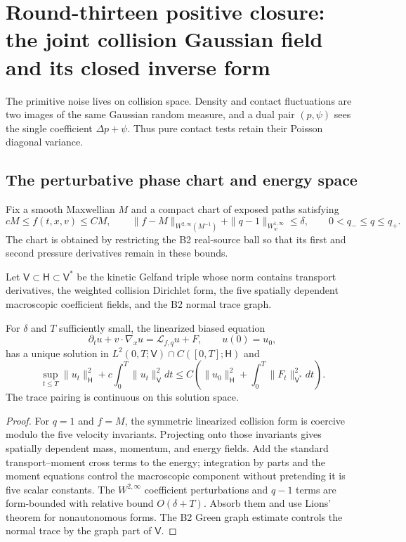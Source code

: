 \section{Round-thirteen positive closure: the joint collision Gaussian field and its closed inverse form}
\label{sec:r13-b3}

The primitive noise lives on collision space.  Density and contact
fluctuations are two images of the same Gaussian random measure, and a dual
pair $(p,\psi)$ sees the single coefficient $\Delta p+\psi$.  Thus pure
contact tests retain their Poisson diagonal variance.

\subsection{The perturbative phase chart and energy space}

Fix a smooth Maxwellian $M$ and a compact chart of exposed paths satisfying
\[
 cM\le f(t,x,v)\le CM,
 \qquad
 \|f-M\|_{W^{2,\infty}(M^{-1})}
 +\|q-1\|_{W^{1,\infty}_w}\le\delta,
 \qquad 0<q_-\le q\le q_+.
\]
The chart is obtained by restricting the B2 real-source ball so that its first
and second pressure derivatives remain in these bounds.

Let $\mathsf V\subset\mathsf H\subset\mathsf V^*$ be the kinetic Gelfand
triple whose norm contains transport derivatives, the weighted collision
Dirichlet form, the five spatially dependent macroscopic coefficient fields,
and the B2 normal trace graph.

\begin{theorem}
\label{thm:r13-b3-energy}
For $\delta$ and $T$ sufficiently small, the linearized biased equation
\[
 \partial_tu+v\cdot\nabla_xu=\mathcal L_{f,q}u+F,
 \qquad u(0)=u_0,
\]
has a unique solution in
$L^2(0,T;\mathsf V)\cap C([0,T];\mathsf H)$ and
\[
 \sup_{t\le T}\|u_t\|_{\mathsf H}^2
 +c\int_0^T\|u_t\|_{\mathsf V}^2dt
 \le C\left(\|u_0\|_{\mathsf H}^2
 +\int_0^T\|F_t\|_{\mathsf V^*}^2dt\right).
\]
The trace pairing is continuous on this solution space.
\end{theorem}

\begin{proof}
For $q=1$ and $f=M$, the symmetric linearized collision form is coercive
modulo the five velocity invariants.  Projecting onto those invariants gives
spatially dependent mass, momentum, and energy fields.  Add the standard
transport--moment cross terms to the energy; integration by parts and the
moment equations control the macroscopic component without pretending it is
five scalar constants.  The $W^{2,\infty}$ coefficient perturbations and
$q-1$ terms are form-bounded with relative bound $O(\delta+T)$.  Absorb them
and use Lions' theorem for nonautonomous forms.  The B2 Green graph estimate
controls the normal trace by the graph part of $\mathsf V$.
\end{proof}

